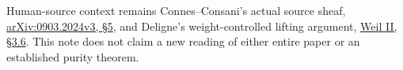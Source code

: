 Human-source context remains Connes--Consani's actual source sheaf,
\href{https://arxiv.org/abs/0903.2024v3}{arXiv:0903.2024v3, §5}, and
Deligne's weight-controlled lifting argument,
\href{https://numdam.org/item/PMIHES_1980__52__137_0/}{Weil II, §3.6}.
This note does not claim a new reading of either entire paper or an
established purity theorem.

